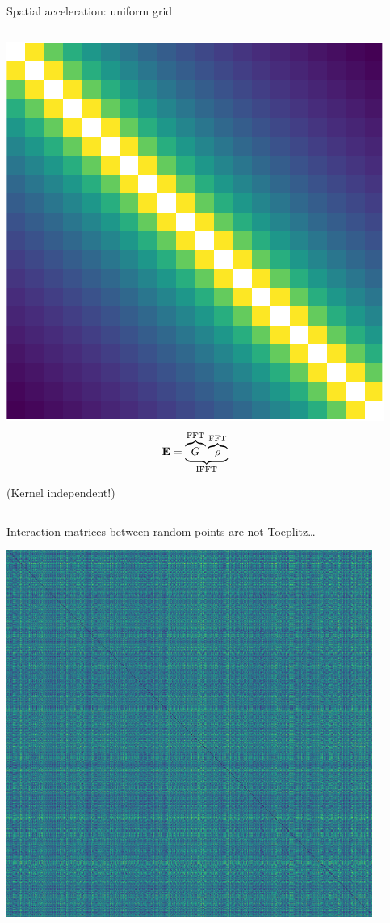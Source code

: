 \documentclass[aspectratio=169, usenames, dvipsnames]{beamer}
\begin{document}
\begin{frame}{Spatial acceleration: uniform grid}
\begin{columns}
      \begin{center}
        \includegraphics[height=0.4\textheight]{figures/grid_1d}
        \begin{equation*}
          \vb{E} = \underbrace{\overbrace{G}^\text{FFT} \overbrace{\rho}^\text{FFT}}_\text{IFFT}
        \end{equation*}

        {\footnotesize (Kernel independent!)}
      \end{center}
  \end{columns}
\end{frame}

\begin{frame}{Interaction matrices between random points are not Toeplitz\ldots}
  \begin{center}
    \includegraphics[height=0.8\textheight]{figures/dist_mat_unsorted}
  \end{center}
\end{frame}
\end{document}
